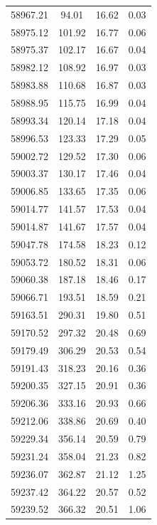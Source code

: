 \begin{longtable}{|c|c|c|c|}
 58967.21 &   94.01 &       16.62 &          0.03 \\
 58975.12 &  101.92 &       16.77 &          0.06 \\
 58975.37 &  102.17 &       16.67 &          0.04 \\
 58982.12 &  108.92 &       16.97 &          0.03 \\
 58983.88 &  110.68 &       16.87 &          0.03 \\
 58988.95 &  115.75 &       16.99 &          0.04 \\
 58993.34 &  120.14 &       17.18 &          0.04 \\
 58996.53 &  123.33 &       17.29 &          0.05 \\
 59002.72 &  129.52 &       17.30 &          0.06 \\
 59003.37 &  130.17 &       17.46 &          0.04 \\
 59006.85 &  133.65 &       17.35 &          0.06 \\
 59014.77 &  141.57 &       17.53 &          0.04 \\
 59014.87 &  141.67 &       17.57 &          0.04 \\
 59047.78 &  174.58 &       18.23 &          0.12 \\
 59053.72 &  180.52 &       18.31 &          0.06 \\
 59060.38 &  187.18 &       18.46 &          0.17 \\
 59066.71 &  193.51 &       18.59 &          0.21 \\
 59163.51 &  290.31 &       19.80 &          0.51 \\
 59170.52 &  297.32 &       20.48 &          0.69 \\
 59179.49 &  306.29 &       20.53 &          0.54 \\
 59191.43 &  318.23 &       20.16 &          0.36 \\
 59200.35 &  327.15 &       20.91 &          0.36 \\
 59206.36 &  333.16 &       20.93 &          0.66 \\
 59212.06 &  338.86 &       20.69 &          0.40 \\
 59229.34 &  356.14 &       20.59 &          0.79 \\
 59231.24 &  358.04 &       21.23 &          0.82 \\
 59236.07 &  362.87 &       21.12 &          1.25 \\
 59237.42 &  364.22 &       20.57 &          0.52 \\
 59239.52 &  366.32 &       20.51 &          1.06 \\
\hline
\end{longtable}

